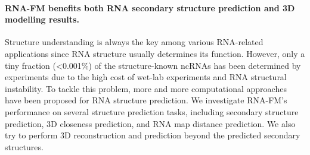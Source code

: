 

\paragraph{RNA-FM benefits both RNA secondary structure prediction and 3D modelling results.} Structure understanding is always the key among various RNA-related applications since RNA structure usually determines its function. However, only a tiny fraction (\textless0.001\%) of the structure-known ncRNAs has been determined by experiments \cite{zhao2021review} due to the high cost of wet-lab experiments and RNA structural instability. To tackle this problem, more and more computational approaches \cite{singh2019rna, chen2020rna,sato2021rna,fu2021ufold} have been proposed for RNA structure prediction. We investigate RNA-FM's performance on several structure prediction tasks, including secondary structure prediction, 3D closeness prediction, and RNA map distance prediction. We also try to perform 3D reconstruction and prediction beyond the predicted secondary structures.

